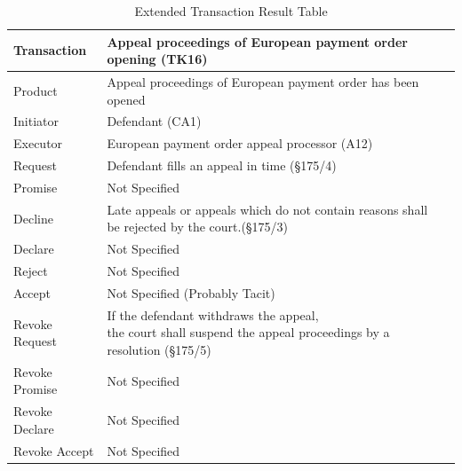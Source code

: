\begin{landscape}
\begin{table}[h]
\caption{Extended Transaction Result Table}
\label{tab:etrt}
\begin{tabular}{|l||l|l|}
\hline
Transaction  &   Appeal proceedings of European payment order opening (TK16) \\ \hline
Product      &  Appeal proceedings of European payment order has been opened \\ \hline
Initiator      &  Defendant (CA1)\\ \hline
Executor       &  European payment order appeal processor (A12) \\ \hline
Request        &   Defendant fills an appeal in time (\S175/4) \\ \hline
Promise        &    Not Specified   \\ \hline
Decline        &  Late appeals or appeals which do not contain reasons shall be rejected by the court.(\S175/3)  \\ \hline
Declare        &  Not Specified  \\ \hline
Reject         &  Not Specified   \\ \hline
Accept         & Not Specified (Probably Tacit) \\ \hline
Revoke Request & \makecell{If the defendant withdraws the appeal,\\ the court shall suspend the appeal proceedings by a resolution (\S175/5)}      \\ \hline
Revoke Promise & Not Specified  \\ \hline
Revoke Declare & Not Specified      \\ \hline
Revoke Accept  &  Not Specified \\ \hline
\end{tabular}
\end{table}



\end{landscape}
